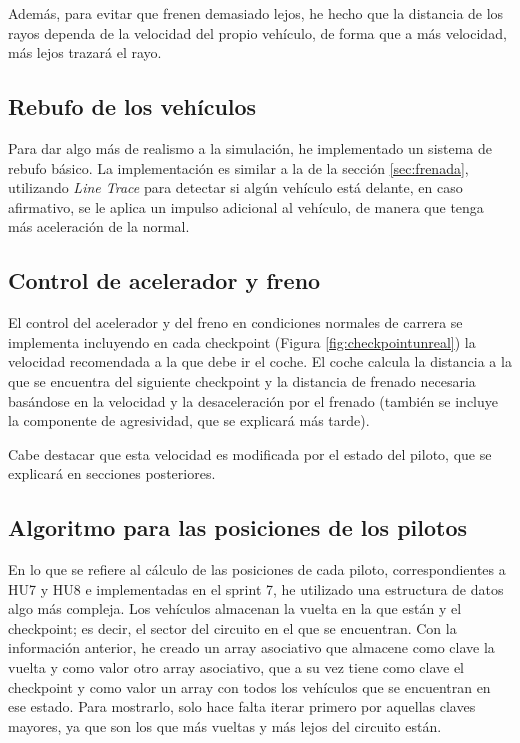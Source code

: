 \bigskip

Además, para evitar que frenen demasiado lejos, he hecho que la distancia de los rayos dependa de la velocidad del propio vehículo, de forma que a más velocidad, más lejos trazará el rayo.

\subsection{Rebufo de los vehículos}

Para dar algo más de realismo a la simulación, he implementado un sistema de rebufo básico. La implementación es similar a la de la sección \ref{sec:frenada}, utilizando \textit{Line Trace} para detectar si algún vehículo está delante, en caso afirmativo, se le aplica un impulso adicional al vehículo, de manera que tenga más aceleración de la normal.

\subsection{Control de acelerador y freno}

El control del acelerador y del freno en condiciones normales de carrera se implementa incluyendo en cada checkpoint (Figura \ref{fig:checkpointunreal}) la velocidad recomendada a la que debe ir el coche. El coche calcula la distancia a la que se encuentra del siguiente checkpoint y la distancia de frenado necesaria basándose en la velocidad y la desaceleración por el frenado (también se incluye la componente de agresividad, que se explicará más tarde).

\bigskip

Cabe destacar que esta velocidad es modificada por el estado del piloto, que se explicará en secciones posteriores.

\subsection{Algoritmo para las posiciones de los pilotos}

En lo que se refiere al cálculo de las posiciones de cada piloto, correspondientes a HU7 y HU8 e implementadas en el sprint 7, he utilizado una estructura de datos algo más compleja. Los vehículos almacenan la vuelta en la que están y el checkpoint; es decir, el sector del circuito en el que se encuentran. Con la información anterior, he creado un array asociativo que almacene como clave la vuelta y como valor otro array asociativo, que a su vez tiene como clave el checkpoint y como valor un array con todos los vehículos que se encuentran en ese estado. Para mostrarlo, solo hace falta iterar primero por aquellas claves mayores, ya que son los que más vueltas y más lejos del circuito están.

